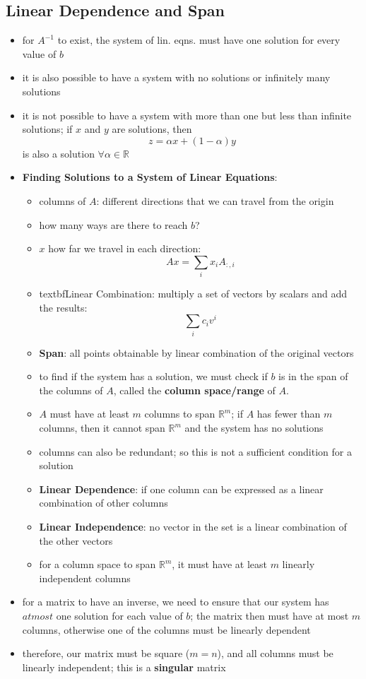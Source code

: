 \subsection{Linear Dependence and Span}
\begin{itemize}
    \item for $A^{-1}$ to exist, the system of lin. eqns. must have one solution for every value of $b$
    \item it is also possible to have a system with no solutions or infinitely many solutions
    \item it is not possible to have a system with more than one but less than infinite solutions;  if $x$ and $y$ are solutions, then 
    $$z = \alpha x + (1 - \alpha) y$$
    is also a solution $\forall \alpha \in \mathbb{R}$
    \item \textbf{Finding Solutions to a System of Linear Equations}:
    \begin{itemize}
        \item columns of $A$: different directions that we can travel from the origin
        \item how many ways are there to reach $b$?
        \item $x$ how far we travel in each direction:
        $$ Ax = \sum_i x_i A_{:, i}$$
        \item textbf{Linear Combination}: multiply a set of vectors by scalars and add the results:
        $$ \sum_i c_i v^{i} $$
        \item \textbf{Span}: all points obtainable by linear combination of the original vectors
        \item to find if the system has a solution, we must check if $b$ is in the span of the columns of $A$, called the \textbf{column space/range} of $A$.
        \item $A$ must have at least $m$ columns to span $\mathbb{R}^m$; if $A$ has fewer than $m$ columns, then it cannot span $\mathbb{R}^m$ and the system has no solutions
        \item columns can also be redundant; so this is not a sufficient condition for a solution
        \item \textbf{Linear Dependence}: if one column can be expressed as a linear combination of other columns 
        \item \textbf{Linear Independence}: no vector in the set is a linear combination of the other vectors
        \item for a column space to span $\mathbb{R}^m$, it must have at least $m$ linearly independent columns
    \end{itemize}
    \item for a matrix to have an inverse, we need to ensure that our system has $at most$ one solution for each value of $b$; the matrix then must have at most $m$ columns, otherwise one of the columns must be linearly dependent
    \item therefore, our matrix must be square ($m = n$), and all columns must be linearly independent; this is a \textbf{singular} matrix
\end{itemize}

